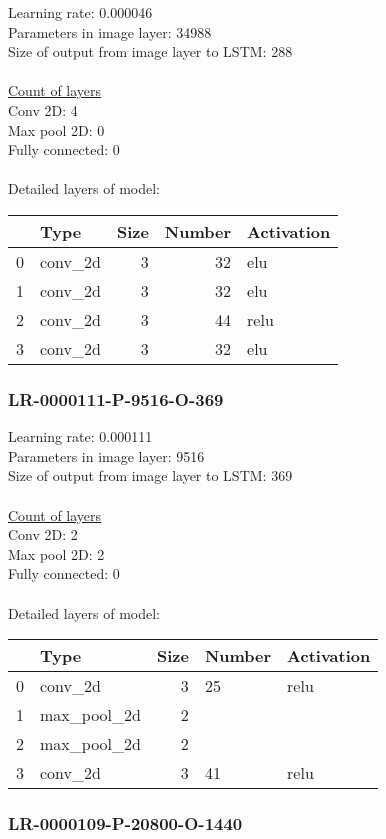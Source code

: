 Learning rate: 0.000046
\\Parameters in image layer: 34988
\\Size of output from image layer to LSTM: 288
\\\\\underline{Count of layers} 
\\Conv 2D:           4\\Max pool 2D:      0\\Fully connected:  0
\\\\Detailed layers of model: \\\begin{tabular}{rlrrl}
\hline
    & Type    &   Size &   Number & Activation   \\
\hline
  0 & conv\_2d &      3 &       32 & elu          \\
  1 & conv\_2d &      3 &       32 & elu          \\
  2 & conv\_2d &      3 &       44 & relu         \\
  3 & conv\_2d &      3 &       32 & elu          \\
\hline
\end{tabular}\subsubsection*{LR-0000111-P-9516-O-369}
Learning rate: 0.000111
\\Parameters in image layer: 9516
\\Size of output from image layer to LSTM: 369
\\\\\underline{Count of layers} 
\\Conv 2D:           2\\Max pool 2D:      2\\Fully connected:  0
\\\\Detailed layers of model: \\\begin{tabular}{rlrll}
\hline
    & Type        &   Size & Number   & Activation   \\
\hline
  0 & conv\_2d     &      3 & 25       & relu         \\
  1 & max\_pool\_2d &      2 &          &              \\
  2 & max\_pool\_2d &      2 &          &              \\
  3 & conv\_2d     &      3 & 41       & relu         \\
\hline
\end{tabular}\subsubsection*{LR-0000109-P-20800-O-1440}
